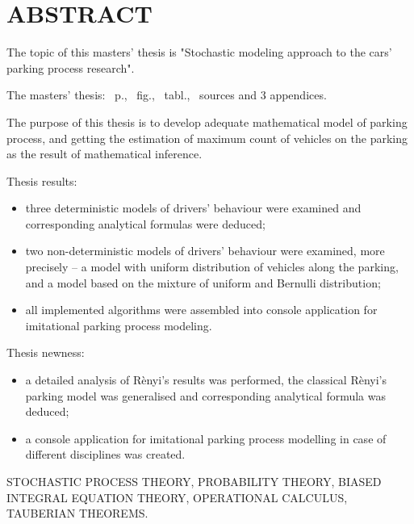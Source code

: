 \chapter*{ABSTRACT}

The topic of this masters' thesis is "Stochastic modeling approach to the cars' parking process research".

The masters' thesis: \pageref*{MyLastPage}~p., \totfig~fig., \tottab~tabl., ~sources and 3 appendices.

The purpose of this thesis is to develop adequate mathematical model of parking process, and getting the estimation of maximum count of vehicles on the parking as the result of mathematical inference.

Thesis results:
\begin{itemize}
	\item three deterministic models of drivers' behaviour were examined and corresponding analytical formulas were deduced;
	\item two non-deterministic models of drivers' behaviour were examined, more precisely – a model with uniform distribution of vehicles along the parking, and a model based on the mixture of uniform and Bernulli distribution;
	\item all implemented algorithms were assembled into console application for imitational parking process modeling.
\end{itemize}

Thesis newness:
\begin{itemize}
	\item a detailed analysis of Rènyi's results was performed, the classical Rènyi's parking model was generalised and corresponding analytical formula was deduced;
	\item a console application for imitational parking process modelling in case of different disciplines was created.  
\end{itemize}

\MakeUppercase{stochastic process theory, probability theory, biased integral equation theory, operational calculus, tauberian theorems.}